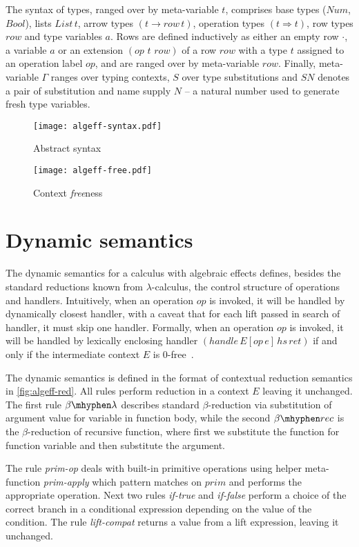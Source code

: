 \documentclass[inz, english, longabstract]{iithesis}
\newcommand{\LC}{\(\lambda\)-calculus}
\begin{document}
The syntax of types, ranged over by meta-variable $ t $, comprises base types ($Num$, $Bool$), lists $List \, t$, arrow types $(t \rightarrow row \, t)$, operation types $(t \Rightarrow t)$, row types $row$ and type variables $ a $.
Rows are defined inductively as either an empty row $\cdot$, a variable $ a $ or an extension $(op \,\, t \,\, row)$ of a row $row$ with a type $t$ assigned to an operation label $op$, and are ranged over by meta-variable $row$.
Finally, meta-variable $\Gamma$ ranges over typing contexts, $S$ over type substitutions and $SN$ denotes a pair of substitution and name supply $N$ -- a natural number used to generate fresh type variables.

\begin{figure}
  \centering
  \texttt{[image: algeff-syntax.pdf]}
  \caption{Abstract syntax}
  \label{fig:algeff-syntax}
\end{figure}

\begin{figure}
  \centering
  \texttt{[image: algeff-free.pdf]}
  \caption{Context \emph{free}ness}
  \label{fig:algeff-free}  
\end{figure}

\section{Dynamic semantics}
The dynamic semantics for a calculus with algebraic effects defines, besides the standard reductions known from \LC{}, the control structure of operations and handlers.
Intuitively, when an operation $op$ is invoked, it will be handled by dynamically closest handler, with a caveat that for each lift passed in search of handler, it must skip one handler.
Formally, when an operation $ op $ is invoked, it will be handled by lexically enclosing handler $ (handle \, E[op \, e] \, hs \, ret) $ if and only if the intermediate context $ E $ is $0$-free~\cite{Biernacki2017}.

The dynamic semantics is defined in the format of contextual reduction semantics in \autoref{fig:algeff-red}.
All rules perform reduction in a context $ E $ leaving it unchanged.
The first rule $\beta\mhyphen\lambda$ describes standard $ \beta $-reduction via substitution of argument value for variable in function body, while the second $\beta\mhyphen rec$ is the $ \beta $-reduction of recursive function, where first we substitute the function for function variable and then substitute the argument.

The rule \emph{prim-op} deals with built-in primitive operations using helper meta-function \textit{prim-apply} which pattern matches on $prim$ and performs the appropriate operation.
Next two rules \emph{if-true} and \emph{if-false} perform a choice of the correct branch in a conditional expression depending on the value of the condition.
The rule \emph{lift-compat} returns a value from a lift expression, leaving it unchanged.
\end{document}
